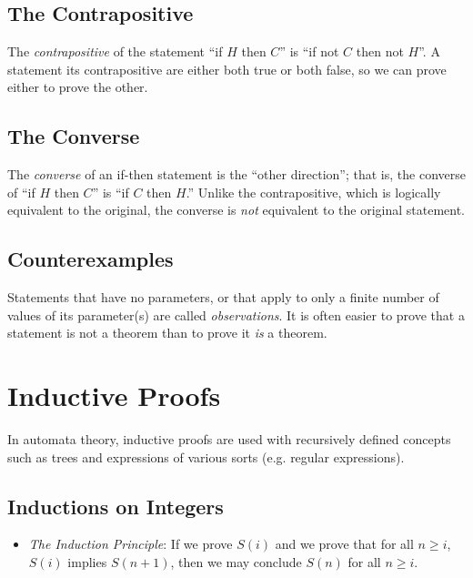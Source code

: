 \documentclass[]{article}
\begin{document}
  \subsection*{The Contrapositive}
    The \emph{contrapositive} of the statement ``if $H$ then $C$'' is ``if not
    $C$ then not $H$''. A statement its contrapositive are either both true or
    both false, so we can prove either to prove the other.
    
  \subsection*{The Converse}
    The \emph{converse} of an if-then statement is the ``other direction''; 
    that is, the converse of ``if $H$ then $C$'' is ``if $C$ then $H$.'' 
    Unlike the contrapositive, which is logically equivalent to the original, 
    the converse is \emph{not} equivalent to the original statement.
  
  \subsection*{Counterexamples}
    Statements that have no parameters, or that apply to only a finite number
    of values of its parameter(s) are called \emph{observations}. It is often
    easier to prove that a statement is not a theorem than to prove it 
    \emph{is} a theorem.
    
\section*{Inductive Proofs}
  In automata theory, inductive proofs are used with recursively defined 
  concepts such as trees and expressions of various sorts (e.g. regular 
  expressions).
  
  \subsection*{Inductions on Integers}
    \begin{itemize}
      \item \emph{The Induction Principle}: If we prove $S(i)$ and we prove 
      that for all $n \geq i$, $S(i)$ implies $S(n + 1)$, then we may conclude
      $S(n)$ for all $n \geq i$.
    \end{itemize}
  
\end{document}
